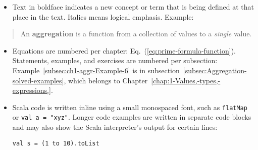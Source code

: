 \begin{itemize}
\item Text in boldface indicates a new concept or term that is being defined
at that place in the text. Italics means logical emphasis. Example:
\end{itemize}
\begin{quotation}
An \textbf{aggregation} is a function from a collection
of values to a \emph{single} value.
\end{quotation}
\begin{itemize}
\item Equations are numbered per chapter: Eq.~(\ref{eq:prime-formula-function}).
Statements, examples, and exercises are numbered per subsection: Example~\ref{subsec:ch1-aggr-Example-6}
is in subsection~\ref{subsec:Aggregation-solved-examples}, which
belongs to Chapter~\ref{chap:1-Values,-types,-expressions,}.
\item Scala code is written inline using a small monospaced font, such as
\lstinline!flatMap! or \lstinline!val a = "xyz"!. Longer code examples
are written in separate code blocks and may also show the Scala interpreter\textsf{'}s
output for certain lines:
\begin{lstlisting}[mathescape=true]
val s = (1 to 10).toList


\end{lstlisting}
\end{itemize}
